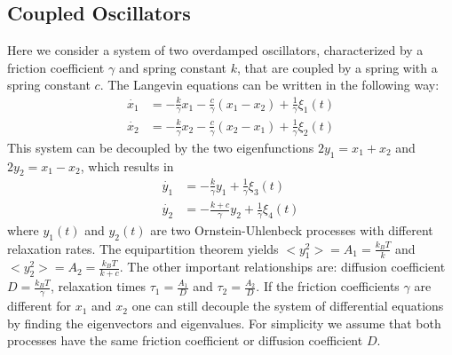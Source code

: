 \documentclass[%
 reprint,
 amsmath,amssymb,
 aps,
]{revtex4-1}
\begin{document}
\subsection{Coupled Oscillators}\label{sec_CO}
Here we consider a system of two overdamped oscillators, characterized by a friction coefficient $\gamma$ and spring constant $k$, that are coupled by a spring with a spring constant $c$.  The Langevin equations can be written in the following way:
\begin{equation}
	\begin{aligned}
		\dot{x_1} &= -\frac{k}{\gamma}x_{1}-\frac{c}{\gamma}(x_{1}-x_{2}) +\frac{1}{\gamma}\xi_{1}(t)\\
		\dot{x_2} &= -\frac{k}{\gamma}x_{2}-\frac{c}{\gamma}(x_{2}-x_{1}) +\frac{1}{\gamma}\xi_{2}(t)
	\end{aligned}
\end{equation}
This system can be decoupled by the two eigenfunctions $2y_{1}=x_{1}+x_{2}$ and $2y_{2}=x_{1}-x_{2}$, which results in
\begin{equation}\label{eq_decoupled}
	\begin{aligned}
		\dot{y_1} &= -\frac{k}{\gamma}y_{1} +\frac{1}{\gamma}\xi_{3}(t)\\
		\dot{y_2} &= -\frac{k+c}{\gamma}y_{2} +\frac{1}{\gamma}\xi_{4}(t)
	\end{aligned}
\end{equation}
where $y_{1}(t)$ and $y_{2}(t)$ are two Ornstein-Uhlenbeck processes with different relaxation rates.  The equipartition theorem yields $<y_{1}^{2}> = A_{1} = \frac{k_{B}T}{k}$ and $<y_{2}^{2}> = A_{2} = \frac{k_{B}T}{k+c}$.  The other important relationships are: diffusion coefficient $D=\frac{k_{B}T}{\gamma}$, relaxation times $\tau_{1}=\frac{A_{1}}{D}$ and $\tau_{2}=\frac{A_{2}}{D}$. If the friction coefficients $\gamma$ are different for $x_{1}$ and $x_{2}$ one can still decouple the system of differential equations by finding the eigenvectors and eigenvalues.  For simplicity we assume that both processes have the same friction coefficient or diffusion coefficient $D$.
\end{document}
